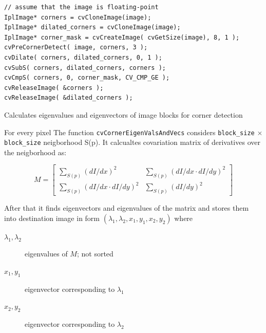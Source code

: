 \begin{lstlisting}
// assume that the image is floating-point
IplImage* corners = cvCloneImage(image);
IplImage* dilated_corners = cvCloneImage(image);
IplImage* corner_mask = cvCreateImage( cvGetSize(image), 8, 1 );
cvPreCornerDetect( image, corners, 3 );
cvDilate( corners, dilated_corners, 0, 1 );
cvSubS( corners, dilated_corners, corners );
cvCmpS( corners, 0, corner_mask, CV_CMP_GE );
cvReleaseImage( &corners );
cvReleaseImage( &dilated_corners );
\end{lstlisting}

\label{CornerEigenValsAndVecs}
Calculates eigenvalues and eigenvectors of image blocks for corner detection


\begin{description}
\end{description}

For every pixel The function \texttt{cvCornerEigenValsAndVecs} considers \texttt{block\_size} $\times$ \texttt{block\_size} neigborhood S(p). It calcualtes covariation matrix of derivatives over the neigborhood as:

\[
M = \begin{bmatrix}
\sum_{S(p)}(dI/dx)^2 & \sum_{S(p)}(dI/dx \cdot dI/dy)^2 \\
\sum_{S(p)}(dI/dx \cdot dI/dy)^2 & \sum_{S(p)}(dI/dy)^2
\end{bmatrix}
\]

After that it finds eigenvectors and eigenvalues of the matrix and stores them into destination image in form
$(\lambda_1, \lambda_2, x_1, y_1, x_2, y_2)$ where
\begin{description}
\item[$\lambda_1, \lambda_2$]eigenvalues of $M$; not sorted
\item[$x_1, y_1$]eigenvector corresponding to $\lambda_1$
\item[$x_2, y_2$]eigenvector corresponding to $\lambda_2$
\end{description}

